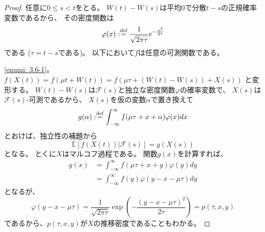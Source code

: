 \documentclass[uplatex]{jsarticle}
\theoremstyle{definition}
\def\E{\mathbb{E}}
\def\mcF{\mathcal{F}}
\def\dfn{:\overset{\mbox{{\scriptsize def}}}{=}}
\begin{document}
\begin{proof}
  任意に\(0\leq s < t\)をとる。
  \(W(t)-W(s)\)は平均\(0\)で分散\(t-s\)の正規確率変数であるから、
  その密度関数は
  \[\varphi(x) \dfn \frac{1}{\sqrt{2\pi\tau}}e^{-\frac{x^2}{2\tau}}\]
  である (\(\tau = t-s\)である)。
  以下において\(f\)は任意の可測関数である。

  \ref{enumi: 3.6-1}。
  \(f(X(t)) = f(\mu t + W(t)) = f(\mu\tau + (W(t)-W(s)) + X(s))\)
  と変形する。
  \(W(t)-W(s)\)は\(\mcF(s)\)と独立な密度関数\(\varphi\)の確率変数で、
  \(X(s)\)は\(\mcF(s)\)-可測であるから、
  \(X(s)\)を仮の変数\(\alpha\)で置き換えて
  \[
  g(\alpha) \dfn \int_{-\infty}^{\infty}f(\mu\tau +x+\alpha)\varphi(x)dx
  \]
  とおけば、独立性の補題から
  \[\E[f(X(t))|\mcF(s)] = g(X(s))\]
  となる。
  とくに\(X\)はマルコフ過程である。
  関数\(g(x)\)を計算すれば、
  \begin{align*}
    g(x)
    &= \int_{-\infty}^{\infty}f(\mu\tau +x+y)\varphi(y)dy \\
    &= \int_{-\infty}^{\infty}f(y)\varphi(y-x-\mu\tau)dy
  \end{align*}
  となるが、
  \[
  \varphi(y-x-\mu\tau) =
  \frac{1}{\sqrt{2\pi\tau}}\exp \left( -\frac{(y-x-\mu\tau)^2}{2\tau}\right)
  = p(\tau,x,y)
  \]
  であるから、\(p(\tau,x,y)\)が\(X\)の推移密度であることもわかる。


\end{proof}
\end{document}
